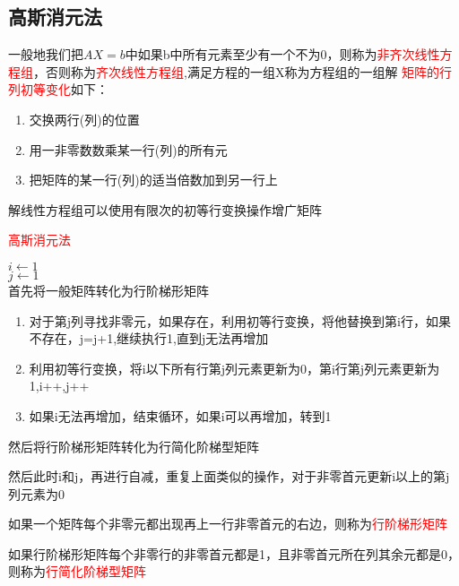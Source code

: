 \subsection{高斯消元法}


\begin{definition}
    一般地我们把$AX=b$中如果b中所有元素至少有一个不为0，则称为\textcolor{red}{非齐次线性方程组}，否则称为\textcolor{red}{齐次线性方程组},满足方程的一组X称为方程组的一组解
\textcolor{red}{矩阵的行列初等变化}如下：

\begin{enumerate}
    \item 交换两行(列)的位置
    \item 用一非零数数乘某一行(列)的所有元
    \item 把矩阵的某一行(列)的适当倍数加到另一行上
\end{enumerate}
\end{definition}


\begin{note}
    解线性方程组可以使用有限次的初等行变换操作增广矩阵
\end{note}

\begin{algorithm}[H]
    \caption[]{\textcolor{red}{高斯消元法}}
    $i\leftarrow 1$\\
    $j\leftarrow 1$\\
    首先将一般矩阵转化为行阶梯形矩阵
    \begin{enumerate}
        \item 对于第j列寻找非零元，如果存在，利用初等行变换，将他替换到第i行，如果不存在，j=j+1,继续执行1,直到j无法再增加
        \item 利用初等行变换，将i以下所有行第j列元素更新为0，第i行第j列元素更新为1,i++,j++
        \item 如果i无法再增加，结束循环，如果i可以再增加，转到1
    \end{enumerate}

    然后将行阶梯形矩阵转化为行简化阶梯型矩阵

    然后此时i和j，再进行自减，重复上面类似的操作，对于非零首元更新i以上的第j列元素为0
\end{algorithm}

如果一个矩阵每个非零元都出现再上一行非零首元的右边，则称为\textcolor{red}{行阶梯形矩阵}

如果行阶梯形矩阵每个非零行的非零首元都是1，且非零首元所在列其余元都是0，则称为\textcolor{red}{行简化阶梯型矩阵}

